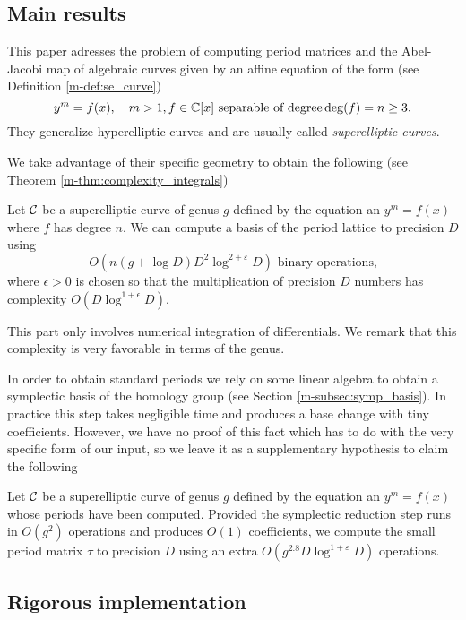 \documentclass[main.tex]{subfiles}
\begin{document}
  \subsection{Main results}

  This paper adresses the problem of computing period matrices and the
  Abel-Jacobi map of algebraic curves given by an affine equation of the form  (see Definition \ref{m-def:se_curve})
  \begin{equation*}
  y^m = f(x), \quad m > 1, f \in \mathbb{C}[x] \text{ separable of degree} \operatorname{deg}(f) = n \ge 3.
  \end{equation*}
  They generalize
  hyperelliptic curves and are usually called \textit{superelliptic curves}.

  We take advantage of their specific geometry to obtain the following
  (see Theorem \ref{m-thm:complexity_integrals})
  \begin{thm}
      Let $\mathcal{C}$ be a superelliptic curve of genus $g$ defined by the equation an $y^m=f(x)$
      where $f$ has degree $n$.
      We can compute a basis of the period lattice to
      precision $D$ using $$O(n(g+\log D)D^2\log^{2+\varepsilon} D) \text{ binary operations,}$$
     where $\epsilon>0$ is chosen so that
      the multiplication of precision $D$ numbers has complexity
      $O(D\log^{1+\epsilon}D)$.
  \end{thm}

  This part only involves numerical integration of differentials. We remark
  that this complexity is very favorable in terms of the genus.

  In order
  to obtain standard periods we rely on some linear algebra to obtain a
  symplectic basis of the homology group (see Section \ref{m-subsec:symp_basis}).
  In practice this step takes negligible time
  and produces a base change with tiny coefficients. However, we have no proof
  of this fact which has to do with the very specific form of our input,
  so we leave it as a supplementary hypothesis to claim the
  following
  \begin{thm}
     Let $\mathcal{C}$ be a superelliptic curve of genus $g$ defined by the equation an $y^m=f(x)$ whose periods
      have been computed.
      Provided the symplectic reduction
      step runs in $O(g^2)$ operations and produces $O(1)$ coefficients,
      we compute the small period matrix $τ$ to precision $D$
      using an extra $O(g^{2.8}D\log^{1+\varepsilon}D)$ operations.
  \end{thm}


  \subsection{Rigorous implementation}
  \label{subsec:arb}
\end{document}
